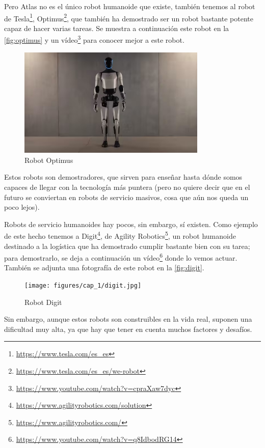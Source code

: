 Pero Atlas no es el único robot humanoide que existe, también tenemos al robot de Tesla\footnote{\url{https://www.tesla.com/es_es}}, Optimus\footnote{\url{https://www.tesla.com/es_es/we-robot}}, que también ha demostrado ser un robot bastante potente capaz de hacer varias tareas. Se muestra a continuación este robot en la \autoref{fig:optimus} y un vídeo\footnote{\url{https://www.youtube.com/watch?v=cpraXaw7dyc}} para conocer mejor a este robot.  

\begin{figure}[H]
    \centering
    \includegraphics[width=0.8\textwidth]{figures/cap_1/optimus.jpg}
    \caption{Robot Optimus}
    \label{fig:optimus}
\end{figure}

Estos robots son demostradores, que sirven para enseñar hasta dónde somos capaces de llegar con la tecnología más puntera (pero no quiere decir que en el futuro se conviertan en robots de servicio masivos, cosa que aún nos queda un poco lejos).

Robots de servicio humanoides hay pocos, sin embargo, sí existen. Como ejemplo de este hecho tenemos a Digit\footnote{\url{https://www.agilityrobotics.com/solution}}, de Agility Robotics\footnote{\url{https://www.agilityrobotics.com/}}, un robot humanoide destinado a la logística que ha demostrado cumplir bastante bien con su tarea; para demostrarlo, se deja a continuación un vídeo\footnote{\url{https://www.youtube.com/watch?v=q8IdbodRG14}} donde lo vemos actuar. También se adjunta una fotografía de este robot en la \autoref{fig:digit}.

\begin{figure}[H]
    \centering
    \texttt{[image: figures/cap\_1/digit.jpg]}
    \caption{Robot Digit}
    \label{fig:digit}
\end{figure}

Sin embargo, aunque estos robots son construibles en la vida real, suponen una dificultad muy alta, ya que hay que tener en cuenta muchos factores y desafíos.

